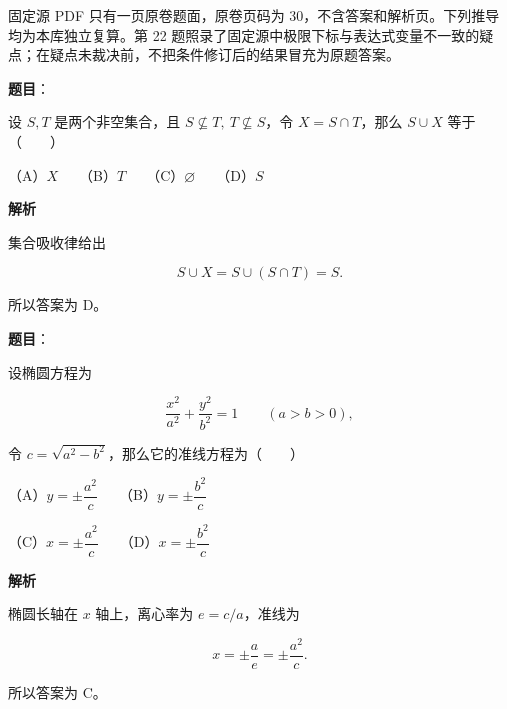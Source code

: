 

\begin{gktip}
固定源 PDF 只有一页原卷题面，原卷页码为 30，不含答案和解析页。下列推导均为本库独立复算。第 22 题照录了固定源中极限下标与表达式变量不一致的疑点；在疑点未裁决前，不把条件修订后的结果冒充为原题答案。
\end{gktip}

\begin{answer}

\textbf{题目}：

设 $S,T$ 是两个非空集合，且 $S\nsubseteq T,\ T\nsubseteq S$，令 $X=S\cap T$，那么 $S\cup X$ 等于\mbox{（　　）}

（A）$X$　　（B）$T$　　（C）$\varnothing$　　（D）$S$

\textbf{解析}

集合吸收律给出

\nopagebreak[4]
\[
S\cup X=S\cup(S\cap T)=S.
\]

所以答案为 D。


\end{answer}
\begin{answer}

\textbf{题目}：

设椭圆方程为

\nopagebreak[4]
\[
\frac{x^2}{a^2}+\frac{y^2}{b^2}=1\qquad(a>b>0),
\]

令 $c=\sqrt{a^2-b^2}$，那么它的准线方程为\mbox{（　　）}

（A）$y=\pm\dfrac{a^2}{c}$　　（B）$y=\pm\dfrac{b^2}{c}$

（C）$x=\pm\dfrac{a^2}{c}$　　（D）$x=\pm\dfrac{b^2}{c}$

\textbf{解析}

椭圆长轴在 $x$ 轴上，离心率为 $e=c/a$，准线为

\nopagebreak[4]
\[
x=\pm\frac ae=\pm\frac{a^2}{c}.
\]

所以答案为 C。


\end{answer}

